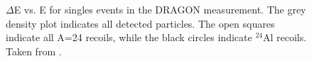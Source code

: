\begin{figure}
\caption{$\Delta$E vs. E for singles events in the DRAGON  measurement. The grey density plot indicates all detected particles. The open squares indicate all A=24 recoils, while the black circles indicate $^{24}$Al recoils. Taken from \cite{eri10}.}
\label{fig:Mg23_dE_E}
\end{figure}